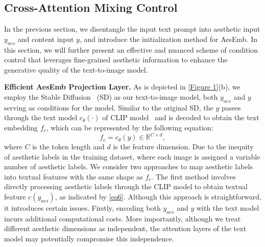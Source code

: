 \subsection{Cross-Attention Mixing Control}
In the previous section, we disentangle the input text prompt into aesthetic input $y_{aes}$ and content input $y$, and introduce the initialization method for AesEmb. In this section, we will further present an effective and nuanced scheme of condition control that leverages fine-grained aesthetic information to enhance the generative quality of the text-to-image model.

\noindent \textbf{Efficient AesEmb Projection Layer.} As is depicted in \cref{Figure 1}(b), we employ the Stable Diffusion~\cite{rombach2022high} (SD) as our text-to-image model, both $y_{aes}$ and $y$ serving as conditions for the model. Similar to the original SD, the $y$ passes through the text model $c_{\theta}(\cdot)$ of CLIP model~\cite{radford2021learning} and is decoded to obtain the text embedding $f_c$, which can be represented by the following equation:
\begin{equation}
f_c=c_{\theta}(y) \in \mathbb{R}^{C \times d},\label{eq6}
\end{equation}
where $C$ is the token length and $d$ is the feature dimension. Due to the inequity of aesthetic labels in the training dataset, where each image is assigned a variable number of aesthetic labels. We consider two approaches to map aesthetic labels into textual features with the same shape as $f_c$. The first method involves directly processing aesthetic labels through the CLIP model to obtain textual feature $c(y_{aes})$, as indicated by \cref{eq6}. Although this approach is straightforward, it introduces certain issues. Firstly, encoding both $y_{aes}$ and $y$ with the text model incurs additional computational costs. More importantly, although we treat different aesthetic dimensions as independent, the attention layers of the text model may potentially compromise this independence.

